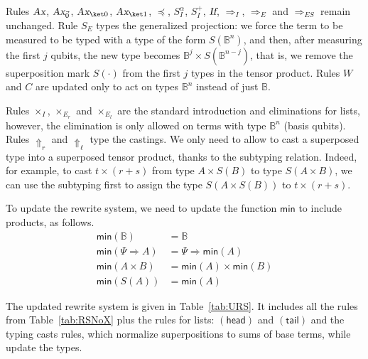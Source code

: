 \documentclass[preprint]{elsarticle}
\newcommand\B{\ensuremath{\mathbb B}}
\newcommand\pair[2]{({#1}+{#2})}
\newcommand\s[1]{\ensuremath{\mathsf{#1}}}
\newcommand\rhead{(\s{head})}
\newcommand\rtail{(\s{tail})}
\newcommand\tax{\textsl{Ax}}
\newcommand\tif{\textsl{If}}
\begin{document}
Rules $\tax$, $\tax_{\vec 0}$, $\tax_{\ket 0}$, $\tax_{\ket 1}$, $\preceq$,
$S_I^\alpha$, $S_I^+$, $\tif$, $\Rightarrow_I$, $\Rightarrow_E$ and
$\Rightarrow_{ES}$ remain unchanged. Rule $S_E$ types the generalized
projection: we force the term to be measured to be typed with a type of the form
$S(\B^n)$, and then, after measuring the first $j$ qubits, the new type becomes
$\B^j\times S(\B^{n-j})$, that is, we remove the superposition mark $S(\cdot)$
from the first $j$ types in the tensor product. Rules $W$ and $C$ are updated
only to act on types $\B^n$ instead of just $\B$.

Rules $\times_I$, $\times_{E_r}$ and $\times_{E_l}$ are the standard
introduction and eliminations for lists, however, the elimination is only
allowed on terms with type $\B^n$ (basis qubits). Rules $\Uparrow_r$ and
$\Uparrow_\ell$ type the castings. We only need to allow to cast a superposed type
into a superposed tensor product, thanks to the subtyping relation. Indeed, for
example, to cast $t\times\pair rs$ from type $A\times S(B)$ to type $S(A\times
B)$, we can use the subtyping first to assign the type $S(A\times S(B))$ to
$t\times\pair rs$.

To update the rewrite system, we need to update the function $\mathsf{min}$ to
include products, as follows.
\begin{align*}
  \mathsf{min}(\B) &= \B\\
  \mathsf{min}(\Psi\Rightarrow A) &=\Psi\Rightarrow\mathsf{min}(A)\\
  \mathsf{min}(A\times B) &=\mathsf{min}(A)\times\mathsf{min}(B)\\
  \mathsf{min}(S(A)) &=\mathsf{min}(A)
\end{align*}

The updated rewrite system is given in Table~\ref{tab:URS}. It includes all the
rules from Table~\ref{tab:RSNoX} plus the rules for lists: $\rhead$ and $\rtail$
and the typing casts rules, which normalize superpositions to sums of base
terms, while update the types.
\end{document}

